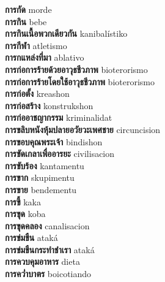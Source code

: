 \textbf{ การกัด  } morde \\
\textbf{ การกิน  } bebe \\
\textbf{ การกินเนื้อพวกเดียวกัน  } kanibalístiko \\
\textbf{ การกีฬา  } atletismo \\
\textbf{ การกแหล่งที่มา  } ablativo \\
\textbf{ การก่อการร้ายด้วยอาวุธชีวภาพ  } bioterorismo \\
\textbf{ การก่อการร้ายโดยใช้อาวุธชีวภาพ  } bioterorismo \\
\textbf{ การก่อตั้ง  } kreashon \\
\textbf{ การก่อสร้าง  } konstrukshon \\
\textbf{ การก่ออาชญากรรม  } kriminalidat \\
\textbf{ การขลิบหนังหุ้มปลายอวัยวะเพศชาย  } circuncision \\
\textbf{ การขอบคุณพระเจ้า  } bindishon \\
\textbf{ การขัดเกลาเพื่ออารยะ  } civilisacion \\
\textbf{ การขับร้อง  } kantamentu \\
\textbf{ การขาก  } skupimentu \\
\textbf{ การขาย  } bendementu \\
\textbf{ การขี้  } kaka \\
\textbf{ การขุด  } koba \\
\textbf{ การขุดคลอง  } canalisacion \\
\textbf{ การข่มขืน  } ataká \\
\textbf{ การข่มขืนกระทำชำเรา  } ataká \\
\textbf{ การควบคุมอาหาร  } dieta \\
\textbf{ การคว่ำบาตร  } boicotiando \\
